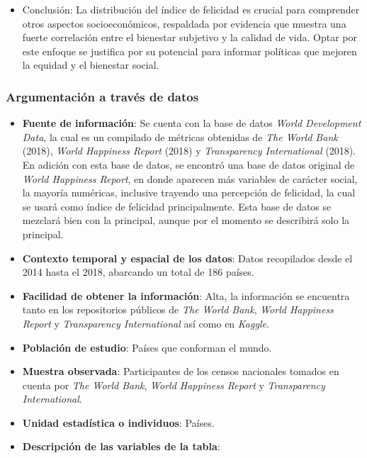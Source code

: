 \documentclass[12pt,oneside,letterpaper,spanish]{article}
\begin{document}
\begin{itemize}
\begin{itemize}
    \end{itemize}
    \item Conclusión: La distribución del índice de felicidad es crucial para comprender otros aspectos socioeconómicos, respaldada por evidencia que muestra una fuerte correlación entre el bienestar subjetivo y la calidad de vida. Optar por este enfoque se justifica por su potencial para informar políticas que mejoren la equidad y el bienestar social.
\end{itemize}

\newpage
\subsubsection{Argumentación a través de datos}

\begin{itemize}
    \item \textbf{Fuente de información}: Se cuenta con la base de datos \textit{World Development Data}, la cual es un compilado de métricas obtenidas de \textit{The World Bank} (2018), \textit{World Happiness Report} (2018) y \textit{Transparency International} (2018). \\
    En adición con esta base de datos, se encontró una base de datos original de \textit{World Happiness Report}, en donde aparecen más variables de carácter social, la mayoría numéricas, inclusive trayendo una percepción de felicidad, la cual se usará como índice de felicidad principalmente. Esta base de datos se mezclará bien con la principal, aunque por el momento se describirá solo la principal. 
    \item \textbf{Contexto temporal y espacial de los datos}: Datos recopilados desde el 2014 hasta el 2018, abarcando un total de 186 países.
    \item \textbf{Facilidad de obtener la información}: Alta, la información se encuentra tanto en los repositorios públicos de \textit{The World Bank}, \textit{World Happiness Report} y \textit{Transparency International} así como en \textit{Kaggle}.
    \item \textbf{Población de estudio}: Países que conforman el mundo.
    \item \textbf{Muestra observada}: Participantes de los censos nacionales tomados en cuenta por \textit{The World Bank}, \textit{World Happiness Report} y \textit{Transparency International}.
    \item \textbf{Unidad estadística o individuos}: Países.
    \item \textbf{Descripción de las variables de la tabla}:

\end{itemize}
\end{document}
